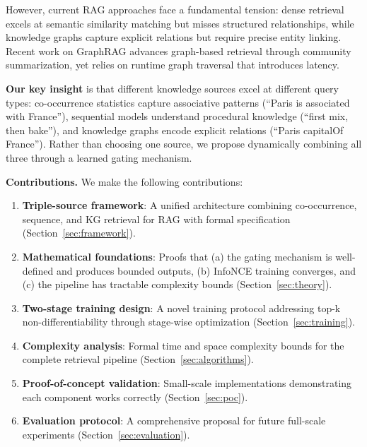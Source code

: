 \documentclass[10pt,twocolumn]{article}
\begin{document}
However, current RAG approaches face a fundamental tension: dense retrieval excels at semantic similarity matching but misses structured relationships, while knowledge graphs capture explicit relations but require precise entity linking. Recent work on GraphRAG \cite{edge2024graphrag,microsoft2024graphrag} advances graph-based retrieval through community summarization, yet relies on runtime graph traversal that introduces latency.

\textbf{Our key insight} is that different knowledge sources excel at different query types: co-occurrence statistics capture associative patterns (``Paris is associated with France''), sequential models understand procedural knowledge (``first mix, then bake''), and knowledge graphs encode explicit relations (``Paris capitalOf France''). Rather than choosing one source, we propose dynamically combining all three through a learned gating mechanism.

\textbf{Contributions.} We make the following contributions:
\begin{enumerate}
    \item \textbf{Triple-source framework}: A unified architecture combining co-occurrence, sequence, and KG retrieval for RAG with formal specification (Section~\ref{sec:framework}).
    
    \item \textbf{Mathematical foundations}: Proofs that (a) the gating mechanism is well-defined and produces bounded outputs, (b) InfoNCE training converges, and (c) the pipeline has tractable complexity bounds (Section~\ref{sec:theory}).
    
    \item \textbf{Two-stage training design}: A novel training protocol addressing top-k non-differentiability through stage-wise optimization (Section~\ref{sec:training}).
    
    \item \textbf{Complexity analysis}: Formal time and space complexity bounds for the complete retrieval pipeline (Section~\ref{sec:algorithms}).
    
    \item \textbf{Proof-of-concept validation}: Small-scale implementations demonstrating each component works correctly (Section~\ref{sec:poc}).
    
    \item \textbf{Evaluation protocol}: A comprehensive proposal for future full-scale experiments (Section~\ref{sec:evaluation}).
\end{enumerate}
\end{document}

